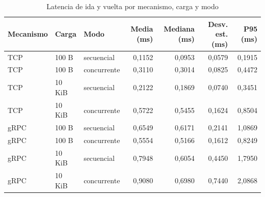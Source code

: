 \begin{table}[htbp]
\centering
\small
\caption{Latencia de ida y vuelta por mecanismo, carga y modo}
\label{tab:latencias}
\begin{tabular}{lllrrrr}
\hline
Mecanismo & Carga & Modo & Media (ms) & Mediana (ms) & Desv. est. (ms) & P95 (ms) \\
\hline
TCP & 100 B & secuencial & 0,1152 & 0,0953 & 0,0579 & 0,1915 \\
TCP & 100 B & concurrente & 0,3110 & 0,3014 & 0,0825 & 0,4472 \\
TCP & 10 KiB & secuencial & 0,2122 & 0,1869 & 0,0740 & 0,3451 \\
TCP & 10 KiB & concurrente & 0,5722 & 0,5455 & 0,1624 & 0,8504 \\
gRPC & 100 B & secuencial & 0,6549 & 0,6171 & 0,2141 & 1,0869 \\
gRPC & 100 B & concurrente & 0,5554 & 0,5166 & 0,1612 & 0,8249 \\
gRPC & 10 KiB & secuencial & 0,7948 & 0,6054 & 0,4450 & 1,7950 \\
gRPC & 10 KiB & concurrente & 0,9080 & 0,6980 & 0,7440 & 2,0868 \\
\hline
\end{tabular}
\end{table}
